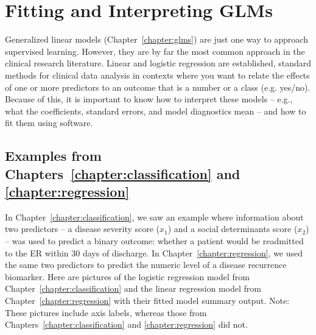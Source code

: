 \chapter{Fitting and Interpreting GLMs \label{chapter:fitglm}}

Generalized linear models (Chapter~\ref{chapter:glms}) are just one way to approach supervised learning. However, they are by far the most common approach in the clinical research literature. Linear and logistic regression are established, standard methods for clinical data analysis in contexts where you want to relate the effects of one or more predictors to an outcome that is a number or a class (e.g. yes/no). Because of this, it is important to know how to interpret these models -- e.g., what the coefficients, standard errors, and model diagnostics mean -- and how to fit them using software. 


\section{Examples from Chapters~\ref{chapter:classification} and \ref{chapter:regression} \label{sect:clregexamples}}

In Chapter~\ref{chapter:classification}, we saw an example where information about two predictors -- a disease severity score ($x_1$) and a social determinants score ($x_2$) -- was used to predict a binary outcome: whether a patient would be readmitted to the ER within 30 days of discharge. In Chapter~\ref{chapter:regression}, we used the same two predictors to predict the numeric level of a disease recurrence biomarker. Here are pictures of the logistic regression model from Chapter~\ref{chapter:classification} and the linear regression model from Chapter~\ref{chapter:regression} with their fitted model summary output. Note: These pictures include axis labels, whereas those from Chapters~\ref{chapter:classification} and \ref{chapter:regression} did not. 

